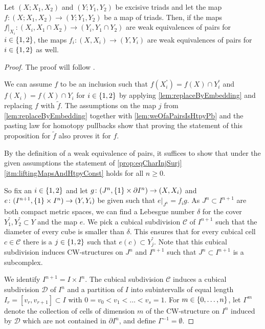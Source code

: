 \begin{prop}\label{prop:descentForPairs}
    Let $(X;X_1,X_2)$ and $(Y;Y_1,Y_2)$ be excisive triads and let the map $f\colon (X;X_1,X_2)\to (Y;Y_1,Y_2)$ be a map of triads.
    Then, if the maps $f|_{X_i}\colon(X_i,X_1\cap X_2)\to(Y_i,Y_1\cap Y_2)$ are weak equivalences of pairs for $i\in\left\lbrace1,2\right\rbrace$, the maps $f_i\colon(X,X_i)\to(Y,Y_i)$ are weak equivalences of pairs for $i\in\left\lbrace1,2\right\rbrace$ as well.
    \begin{proof}
        The proof will follow \cite[Theorem 1.2]{may1990weak}.

        We can assume $f$ to be an inclusion such that $f(X_i^°)=f(X)\cap Y_i^°$ and $f(X_i)=f(X)\cap Y_i$ for $i\in\left\lbrace1,2\right\rbrace$ by applying \cref{lem:replaceByEmbedding} and replacing $f$ with $\widetilde{f}$.
        The assumptions on the map $j$ from \cref{lem:replaceByEmbedding} together with \cref{lem:weOfaPairsIsHtpyPb} and the pasting law for homotopy pullbacks show that proving the statement of this proposition for $\widetilde{f}$ also proves it for $f$.
        
        By the definition of a weak equivalence of pairs, it suffices to show that under the given assumptions the statement of \cref{prop:eqCharInjSurj} \ref{itm:liftingMapsAndHtpyConst} holds for all $n\geq 0$.
    
        So fix an $i\in\left\lbrace1,2\right\rbrace$ and let $g\colon(J^n,\left\lbrace1\right\rbrace\times\partial I^n)\to(X,X_i)$ and $e\colon(I^{n+1},\left\lbrace1\right\rbrace\times I^n)\to(Y,Y_i)$ be given such that $e|_{J^n}=f_ig$.
        As $J^n\subset I^{n+1}$ are both compact metric spaces, we can find a Lebesgue number $\delta$ for the cover $Y_1^°,Y_2^°\subset Y$ and the map $e$.
        We pick a cubical subdivision $\mathcal{C}$ of $I^{n+1}$ such that the diameter of every cube is smaller than $\delta$.
        This ensures that for every cubical cell $c\in\mathcal{C}$ there is a $j\in\left\lbrace1,2\right\rbrace$ such that $e(c)\subset Y_j^°$.
        Note that this cubical subdivision induces CW-structures on $J^n$ and $I^{n+1}$ such that $J^n\subset I^{n+1}$ is a subcomplex.

        We identify $I^{n+1}=I\times I^n$.
        The cubical subdivision $\mathcal{C}$ induces a cubical subdivision $\mathcal{D}$ of $I^n$ and a partition of $I$ into subintervalls of equal length $I_r=[v_r,v_{r+1}]\subset I$ with $0=v_0<v_1<\ldots<v_s=1$.
        For $m\in\left\lbrace0,\ldots,n\right\rbrace$, let $\Gamma^m$ denote the collection of cells of dimension $m$ of the CW-structure on $I^n$ induced by $\mathcal{D}$ which are not contained in $\partial I^n$, and define $\Gamma^{-1}=\emptyset$.
        

\end{proof}
\end{prop}
